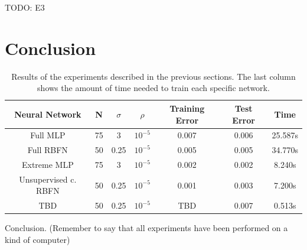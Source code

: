 \documentclass[a4paper]{article}
\numberwithin{equation}{section} %
\numberwithin{figure}{section} %
\numberwithin{table}{section} %
\theoremstyle{definition}
\begin{document}
TODO: E3


\section{Conclusion}

\begin{table}
	\footnotesize
	\centering
	\begin{tabular}{*{7}{c}}
		Neural Network & N & $\sigma$ & $\rho$ & Training Error & Test Error & Time \\
		\hline
		Full MLP & 75 & 3 & $10^{-5}$ & 0.007 & 0.006 & 25.587s \\
		Full RBFN & 50 & 0.25 & $10^{-5}$ & 0.005 & 0.005 & 34.770s \\
		Extreme MLP & 75 & 3 & $10^{-5}$ & 0.002 & 0.002 & 8.240s \\
		Unsupervised c. RBFN & 50 & 0.25 & $10^{-5}$ & 0.001 & 0.003 & 7.200s \\
		TBD & 50 & 0.25 & $10^{-5}$ & TBD & 0.007 & 0.513s \\
	\end{tabular}
	\caption{Results of the experiments described in the previous sections.
		The last column shows the amount of time needed to train each
		specific network.}
	\label{tab:experiments}
\end{table}

Conclusion. (Remember to say that all experiments have been performed on
a kind of computer)
\end{document}
